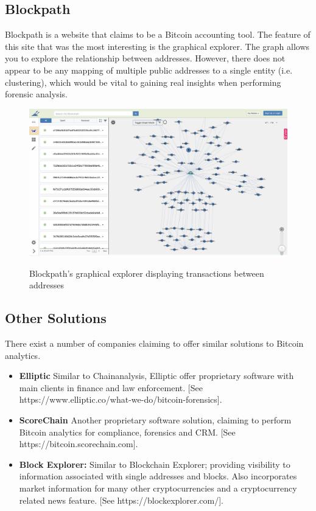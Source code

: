 \subsection{Blockpath}\label{background:blockpath}
Blockpath is a website that claims to be a Bitcoin accounting tool. The feature of this site that was the most interesting is the graphical explorer. The graph allows you to explore the relationship between addresses. However, there does not appear to be any mapping of multiple public addresses to a single entity (i.e. clustering), which would be vital to gaining real insights when performing forensic analysis.  

\begin{figure}
  \centering
  \includegraphics[width = 15cm]{./figures/blockpath}\\[0.5cm] 
  \caption{Blockpath's graphical explorer displaying transactions between addresses \protect \footnotemark}
\end{figure}

\subsection{Other Solutions}

There exist a number of companies claiming to offer similar solutions to Bitcoin analytics. 

\begin{itemize}
    \item \textbf{Elliptic} Similar to Chainanalysis, Elliptic offer proprietary software with main clients in finance and law enforcement. [See https://www.elliptic.co/what-we-do/bitcoin-forensics]. 
    \item \textbf{ScoreChain} Another proprietary software solution, claiming to perform Bitcoin analytics for compliance, forensics and CRM. [See https://bitcoin.scorechain.com]. 
    \item \textbf{Block Explorer:} Similar to Blockchain Explorer; providing visibility to information associated with single addresses and blocks. Also incorporates market information for many other cryptocurrencies and a cryptocurrency related news feature. [See https://blockexplorer.com/]. 

\end{itemize}


